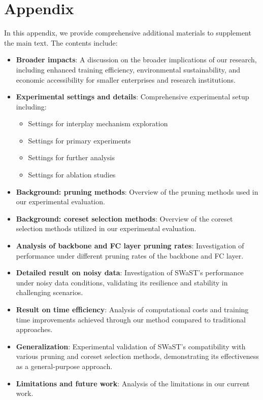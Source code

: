 \clearpage
\setcounter{page}{1}
\appendix

\section*{Appendix}
In this appendix, we provide comprehensive additional materials to supplement the main text. The contents include:
\begin{itemize}
\item \textbf{Broader impacts}: A discussion on the broader implications of our research, including enhanced training efficiency, environmental sustainability, and economic accessibility for smaller enterprises and research institutions.

\item \textbf{Experimental settings and details}: Comprehensive experimental setup including: \begin{itemize}
    \item Settings for interplay mechanism exploration
    \item Settings for primary experiments
    \item Settings for further analysis
    \item Settings for ablation studies
\end{itemize}

\item \textbf{Background: pruning methods}: Overview of the pruning methods used in our experimental evaluation.  

\item \textbf{Background: coreset selection methods}: Overview of the coreset selection methods utilized in our experimental evaluation.

\item \textbf{Analysis of backbone and FC layer pruning rates}: Investigation of performance under different pruning rates of the backbone and FC layer.  

\item \textbf{Detailed result on noisy data}: Investigation of SWaST's performance under noisy data conditions, validating its resilience and stability in challenging scenarios.

\item \textbf{Result on time efficiency}: Analysis of computational costs and training time improvements achieved through our method compared to traditional approaches. 

\item \textbf{Generalization}: Experimental validation of SWaST's compatibility with various pruning and coreset selection methods, demonstrating its effectiveness as a general-purpose approach.

\item \textbf{Limitations and future work}: Analysis of the limitations in our current work.

\end{itemize}

